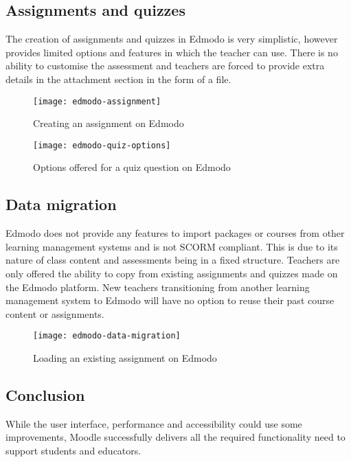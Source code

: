 \subsection{Assignments and quizzes}
The creation of assignments and quizzes in Edmodo is very simplistic, however provides limited options and features in which the teacher can use. There is no ability to customise the assessment and teachers are forced to provide extra details in the attachment section in the form of a file.
\begin{figure}
\centering
\texttt{[image: edmodo-assignment]}
\caption{Creating an assignment on Edmodo}
\end{figure}

\begin{figure}
\centering
\texttt{[image: edmodo-quiz-options]}
\caption{Options offered for a quiz question on Edmodo}
\end{figure}

\subsection{Data migration}
Edmodo does not provide any features to import packages or courses from other learning management systems and is not SCORM compliant. This is due to its nature of class content and assessments being in a fixed structure. Teachers are only offered the ability to copy from existing assignments and quizzes made on the Edmodo platform. New teachers transitioning from another learning management system to Edmodo will have no option to reuse their past course content or assignments.
\begin{figure}
\centering
\texttt{[image: edmodo-data-migration]}
\caption{Loading an existing assignment on Edmodo}
\end{figure}

\subsection{Conclusion}
While the user interface, performance and accessibility could use some improvements, Moodle successfully delivers all the required functionality need to support students and educators.
